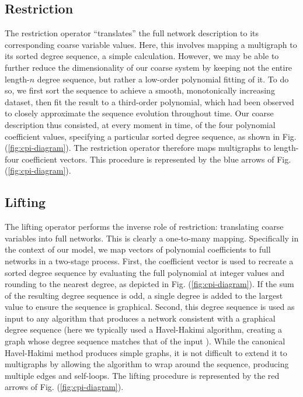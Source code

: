   \subsection{Restriction}

  The restriction operator ``translates'' the full network description
  to its corresponding coarse variable values.
  Here, this involves mapping a multigraph to its sorted degree
  sequence, a simple calculation.
  However, we may be able to further reduce the dimensionality of our
  coarse system by keeping not the entire length-$n$ degree sequence,
  but rather a low-order polynomial fitting of it.
  To do so, we first sort the sequence to achieve a smooth,
  monotonically increasing dataset, then fit the result to a
  third-order polynomial, which had been observed to closely
  approximate the sequence evolution throughout time.
  Our coarse description thus consisted, at every moment in time, of
  the four polynomial coefficient values, specifying a particular
  sorted degree sequence, as shown in Fig. (\ref{fig:cpi-diagram}).
  The restriction operator therefore maps multigraphs to length-four
  coefficient vectors.
  This procedure is represented by the blue arrows of
  Fig. (\ref{fig:cpi-diagram}).

  \subsection{Lifting}

  The lifting operator performs the inverse role of restriction:
  translating coarse variables into full networks.
  This is clearly a one-to-many mapping.
  Specifically in the context of our model, we map vectors of
  polynomial coefficients to full networks in a two-stage process.
  First, the coefficient vector is used to recreate a sorted degree
  sequence by evaluating the full polynomial at integer values and
  rounding to the nearest degree, as depicted in
  Fig. (\ref{fig:cpi-diagram}).
  If the sum of the resulting degree sequence is odd, a single degree
  is added to the largest value to ensure the sequence is graphical.
  Second, this degree sequence is used as input to any algorithm that
  produces a network consistent with a graphical degree sequence (here
  we typically used a Havel-Hakimi algorithm, creating a graph whose
  degree sequence matches that of the input
  \cite{havel_remark_1955,hakimi_realizability_1962}).
  While the canonical Havel-Hakimi method produces simple graphs, it
  is not difficult to extend it to multigraphs by allowing the
  algorithm to wrap around the sequence, producing multiple edges and
  self-loops.  The lifting procedure is represented by the red arrows
  of Fig. (\ref{fig:cpi-diagram}).


